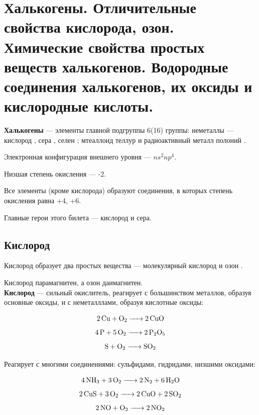
\section{Халькогены. Отличительные свойства кислорода, озон. Химические свойства простых веществ халькогенов. Водородные соединения халькогенов, их оксиды и кислородные кислоты.}

\textbf{Халькогены} --- элементы главной подгруппы 6(16) группы: неметаллы --- кислород , сера , селен ; мтеаллоид теллур  и радиоактивный металл полоний .

Электронная конфигурация внешнего уровня --- $ns^2np^4$.

Низшая степень окисления --- -2.

Все элементы (кроме кислорода) образуют соединения, в которых степень окисления равна +4, +6.

Главные герои этого билета --- кислород и сера.

\subsection{Кислород}

Кислород образует два простых вещества --- молекулярный кислород  и озон .

Кислород парамагнитен, а озон даимагнитен.\\

\textbf{Кислород} --- сильный окислитель, реагирует с большинством металлов, образуя основные оксиды, и с неметалллами, образуя кислотные оксиды:

\begin{equation*}
\ce{2Cu + O2 -> 2CuO}
\end{equation*}
\begin{equation*}
\ce{4P + 5O2 -> 2P2O5}
\end{equation*}
\begin{equation*}
\ce{S + O2 -> SO2}
\end{equation*}

Реагирует с многими соединениями: сульфидами, гидридами, низшими оксидами:

\begin{equation*}
\ce{4NH3 + 3O2 -> 2N2 + 6H2O}
\end{equation*}
\begin{equation*}
\ce{2CuS + 3O2 -> 2CuO + 2SO2}
\end{equation*}
\begin{equation*}
\ce{2NO + O2 -> 2NO2}
\end{equation*}

